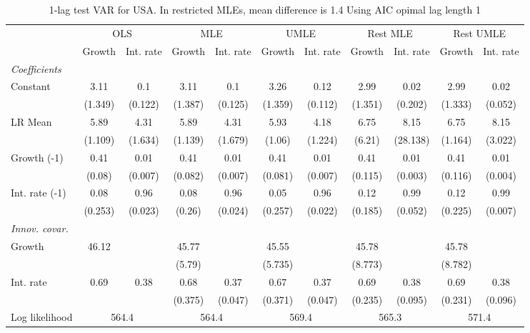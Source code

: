 \begin{table}[htbp] 
	\centering
	\begin{tabular}{@{\extracolsep{4pt}}lcccccccccc@{}}		\hline\hline
		 		 & \multicolumn{2}{c}{OLS} &\multicolumn{2}{c}{MLE} &\multicolumn{2}{c}{UMLE} &\multicolumn{2}{c}{Rest MLE} &\multicolumn{2}{c}{Rest UMLE} \\ 
 		 & Growth 	 & Int. rate 	 & Growth 	 & Int. rate 	 & Growth 	 & Int. rate 	 & Growth 	 & Int. rate 	 & Growth 	 & Int. rate\\\cline{2-3}\cline{4-5}\cline{6-7}\cline{8-9}\cline{10-11}
\rule{0pt}{4ex} 
 \emph{Coefficients} 	  		 & 		 & 		 & 		 & 		 & 		 & 		 & 		 & 		 & 		 &\\ 
\quad Constant 	 & 3.11 	 & 0.1 	 & 3.11 	 & 0.1 	 & 3.26 	 & 0.12 	 & 2.99 	 & 0.02 	 & 2.99 	 & 0.02	 \\ 
 		 & (1.349) 	 & (0.122) 	 & (1.387) 	 & (0.125) 	 & (1.359) 	 & (0.112) 	 & (1.351) 	 & (0.202) 	 & (1.333) 	 & (0.052) 	 \\ 
\quad LR Mean 	 & 5.89 	 & 4.31 	 & 5.89 	 & 4.31 	 & 5.93 	 & 4.18 	 & 6.75 	 & 8.15 	 & 6.75 	 & 8.15	 \\ 
 		 & (1.109) 	 & (1.634) 	 & (1.139) 	 & (1.679) 	 & (1.06) 	 & (1.224) 	 & (6.21) 	 & (28.138) 	 & (1.164) 	 & (3.022) 	 \\ 
\quad Growth (-1) 	 &0.41 	 & 0.01 	 & 0.41 	 & 0.01 	 & 0.41 	 & 0.01 	 & 0.41 	 & 0.01 	 & 0.41 	 & 0.01	 \\ 
 		 & (0.08) 	 & (0.007) 	 & (0.082) 	 & (0.007) 	 & (0.081) 	 & (0.007) 	 & (0.115) 	 & (0.003) 	 & (0.116) 	 & (0.004) 	 \\ 
\quad Int. rate (-1) 	 &0.08 	 & 0.96 	 & 0.08 	 & 0.96 	 & 0.05 	 & 0.96 	 & 0.12 	 & 0.99 	 & 0.12 	 & 0.99	 \\ 
 		 & (0.253) 	 & (0.023) 	 & (0.26) 	 & (0.024) 	 & (0.257) 	 & (0.022) 	 & (0.185) 	 & (0.052) 	 & (0.225) 	 & (0.007) 	 \\ 
\rule{0pt}{4ex} \emph{Innov. covar.}  	 & 	 & 	 & 	 & 	 & 	 & 	 & 	 & 	 & 	 &\\ 
\quad Growth 	 &46.12 	 &  	 & 45.77 	 &  	 & 45.55 	 &  	 & 45.78 	 &  	 & 45.78 	 & 	 \\ 
 		 &  	 &  	 & (5.79) 	 &  	 & (5.735) 	 &  	 & (8.773) 	 &  	 & (8.782) 	 &  	 \\ 
\quad Int. rate 	 &0.69 	 & 0.38 	 & 0.68 	 & 0.37 	 & 0.67 	 & 0.37 	 & 0.69 	 & 0.38 	 & 0.69 	 & 0.38	 \\ 
 		 &  	 &  	 & (0.375) 	 & (0.047) 	 & (0.371) 	 & (0.047) 	 & (0.235) 	 & (0.095) 	 & (0.231) 	 & (0.096) 	 \\ 
 \hline \rule{0pt}{4ex} 
  Log likelihood 	 &\multicolumn{2}{c}{564.4} 	 & \multicolumn{2}{c}{564.4} 	 & \multicolumn{2}{c}{569.4} 	 & \multicolumn{2}{c}{565.3} 	 & \multicolumn{2}{c}{571.4}\\ 

 \hline 	\end{tabular}		\caption{1-lag test VAR for USA. In restricted MLEs, mean difference is 1.4 Using AIC opimal lag length 1}
		\label{tab:USAopt_}

\end{table}